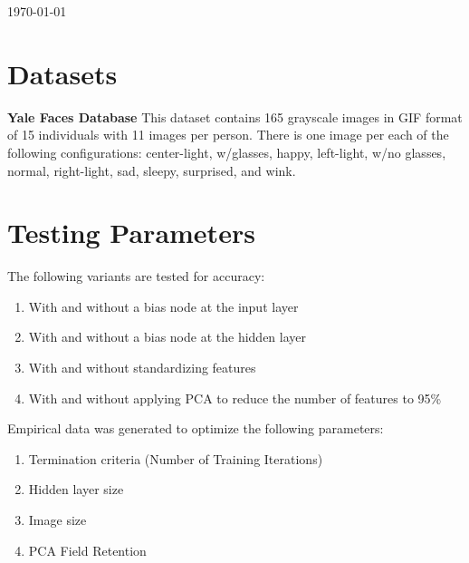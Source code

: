 \documentclass[12pt]{article}
\begin{document}
\begin{titlepage}

{\large \today}\\[3cm] %




\vfill %
\end{titlepage}

\newpage

\section{Datasets}
\textbf{Yale Faces Database} \quad This dataset contains 165 grayscale images in GIF format of 15 individuals with 11 images per person. There is one image per each of the following configurations: center-light, w/glasses, happy, left-light, w/no glasses, normal, right-light, sad, sleepy, surprised, and wink.


\section{Testing Parameters}
The following variants are tested for accuracy:
\begin{enumerate}
  \item With and without a bias node at the input layer
  \item With and without a bias node at the hidden layer
  \item With and without standardizing features
  \item With and without applying PCA to reduce the number of features to 95\%
\end{enumerate}
Empirical data was generated to optimize the following parameters:
\begin{enumerate}
  \item Termination criteria (Number of Training Iterations)
  \item Hidden layer size
  \item Image size
  \item PCA Field Retention
\end{enumerate}
\end{document}
